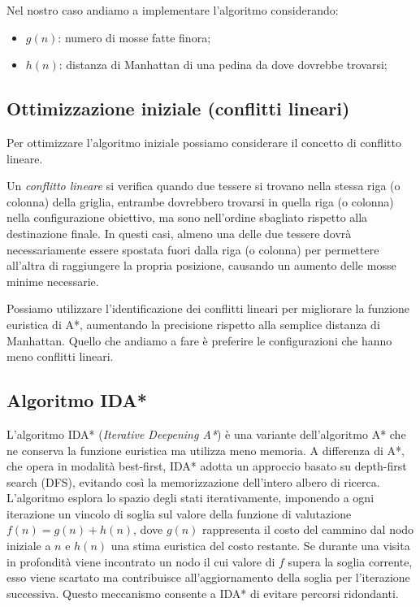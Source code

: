 Nel nostro caso andiamo a implementare l'algoritmo considerando:
\begin{itemize}
    \item $g(n)$: numero di mosse fatte finora;
    \item $h(n)$: distanza di Manhattan di una pedina da dove dovrebbe trovarsi;
\end{itemize}

\subsection{Ottimizzazione iniziale (conflitti lineari)}
Per ottimizzare l'algoritmo iniziale possiamo considerare il concetto di conflitto lineare. 

Un \textit{conflitto lineare} si verifica quando due tessere si trovano nella stessa riga (o colonna) della griglia, entrambe dovrebbero trovarsi in quella riga (o colonna) nella configurazione obiettivo, ma sono nell'ordine sbagliato rispetto alla destinazione finale. In questi casi, almeno una delle due tessere dovrà necessariamente essere spostata fuori dalla riga (o colonna) per permettere all’altra di raggiungere la propria posizione, causando un aumento delle mosse minime necessarie.

Possiamo utilizzare l'identificazione dei conflitti lineari per migliorare la funzione euristica di A*, aumentando la precisione rispetto alla semplice distanza di Manhattan. Quello che andiamo a fare è preferire le configurazioni che hanno meno conflitti lineari. 

\subsection{Algoritmo IDA* \cite{16}}
L'algoritmo IDA* (\textit{Iterative Deepening A*}) è una variante dell'algoritmo A* che ne conserva la funzione euristica ma utilizza meno memoria. A differenza di A*, che opera in modalità best-first, IDA* adotta un approccio basato su depth-first search (DFS), evitando così la memorizzazione dell'intero albero di ricerca. L'algoritmo esplora lo spazio degli stati iterativamente, imponendo a ogni iterazione un vincolo di soglia sul valore della funzione di valutazione \( f(n) = g(n) + h(n) \), dove \( g(n) \) rappresenta il costo del cammino dal nodo iniziale a \( n \) e \( h(n) \) una stima euristica del costo restante. Se durante una visita in profondità viene incontrato un nodo il cui valore di \( f \) supera la soglia corrente, esso viene scartato ma contribuisce all’aggiornamento della soglia per l’iterazione successiva. Questo meccanismo consente a IDA* di evitare percorsi ridondanti.

